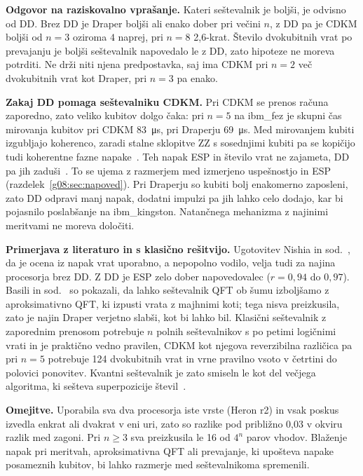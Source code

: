 \smallskip\noindent\textbf{Odgovor na raziskovalno vprašanje.} Kateri seštevalnik je boljši, je odvisno od DD. Brez DD je Draper boljši ali enako dober pri večini $n$, z DD pa je CDKM boljši od $n = 3$ oziroma $4$ naprej, pri $n = 8$ 2,6-krat. Število dvokubitnih vrat po prevajanju je boljši seštevalnik napovedalo le z DD, zato hipoteze ne moreva potrditi. Ne drži niti njena predpostavka, saj ima CDKM pri $n = 2$ več dvokubitnih vrat kot Draper, pri $n = 3$ pa enako.

\smallskip\noindent\textbf{Zakaj DD pomaga seštevalniku CDKM.} Pri CDKM se prenos računa zaporedno, zato veliko kubitov dolgo čaka: pri $n = 5$ na ibm\_fez je skupni čas mirovanja kubitov pri CDKM 83~\si{\micro\second}, pri Draperju 69~\si{\micro\second}. Med mirovanjem kubiti izgubljajo koherenco, zaradi stalne sklopitve ZZ s sosednjimi kubiti pa se kopičijo tudi koherentne fazne napake~\cite{g08:tripathi2022}. Teh napak ESP in število vrat ne zajameta, DD pa jih zaduši~\cite{g08:ezzell2023}. To se ujema z razmerjem med izmerjeno uspešnostjo in ESP (razdelek~\ref{g08:sec:napoved}). Pri Draperju so kubiti bolj enakomerno zaposleni, zato DD odpravi manj napak, dodatni impulzi pa jih lahko celo dodajo, kar bi pojasnilo poslabšanje na ibm\_kingston. Natančnega mehanizma z najinimi meritvami ne moreva določiti.

\smallskip\noindent\textbf{Primerjava z literaturo in s klasično rešitvijo.} Ugotovitev Nishia in sod.~\cite{g08:nishio2020}, da je ocena iz napak vrat uporabno, a nepopolno vodilo, velja tudi za najina procesorja brez DD. Z DD je ESP zelo dober napovedovalec ($r = 0{,}94$ do $0{,}97$). Basili in sod.~\cite{g08:basili2025} so pokazali, da lahko seštevalnik QFT ob šumu izboljšamo z aproksimativno QFT, ki izpusti vrata z majhnimi koti; tega nisva preizkusila, zato je najin Draper verjetno slabši, kot bi lahko bil. Klasični seštevalnik z zaporednim prenosom potrebuje $n$ polnih seštevalnikov s po petimi logičnimi vrati in je praktično vedno pravilen, CDKM kot njegova reverzibilna različica pa pri $n = 5$ potrebuje 124 dvokubitnih vrat in vrne pravilno vsoto v četrtini do polovici ponovitev. Kvantni seštevalnik je zato smiseln le kot del večjega algoritma, ki sešteva superpozicije števil~\cite{g08:vedral1996}.

\smallskip\noindent\textbf{Omejitve.} Uporabila sva dva procesorja iste vrste (Heron r2) in vsak poskus izvedla enkrat ali dvakrat v eni uri, zato so razlike pod približno 0,03 v okviru razlik med zagoni. Pri $n \ge 3$ sva preizkusila le 16 od $4^n$ parov vhodov. Blaženje napak pri meritvah, aproksimativna QFT ali prevajanje, ki upošteva napake posameznih kubitov, bi lahko razmerje med seštevalnikoma spremenili.

